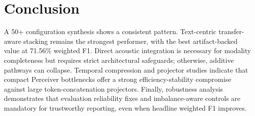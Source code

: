 \documentclass[11pt,a4paper,twocolumn]{article}
\begin{document}
\section{Conclusion}
A 50+ configuration synthesis shows a consistent pattern. Text-centric transfer-aware stacking remains the strongest performer, with the best artifact-backed value at 71.56\% weighted F1. Direct acoustic integration is necessary for modality completeness but requires strict architectural safeguards; otherwise, additive pathways can collapse. Temporal compression and projector studies indicate that compact Perceiver bottlenecks offer a strong efficiency-stability compromise against large token-concatenation projectors. Finally, robustness analysis demonstrates that evaluation reliability fixes and imbalance-aware controls are mandatory for trustworthy reporting, even when headline weighted F1 improves.
\end{document}
